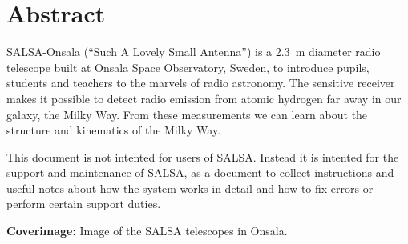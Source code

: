 \chapter*{Abstract}
SALSA-Onsala (``Such A Lovely Small Antenna'') is a 2.3~m diameter radio
telescope built at Onsala Space Observatory, Sweden, to introduce pupils,
students and teachers to the marvels of radio astronomy.  The sensitive
receiver makes it possible to detect radio emission from atomic hydrogen far
away in our galaxy, the Milky Way. From these measurements we can learn about
the structure and kinematics of the Milky Way.

This document is not intented for users of SALSA. Instead it is intented
for the support and maintenance of SALSA, as a document to collect
instructions and useful notes about how the system works in detail and how
to fix errors or perform certain support duties. 

\vspace{9cm}




{\bf Coverimage:} Image of the SALSA telescopes in Onsala.

